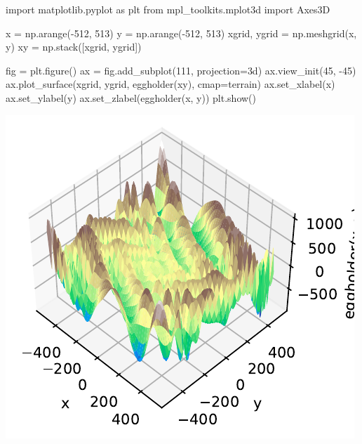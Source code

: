 \documentclass[
  letterpaper,
  DIV=11,
  numbers=noendperiod]{scrreprt}
\newenvironment{Shaded}{\begin{snugshade}}{\end{snugshade}}
\newcommand{\DecValTok}[1]{\textcolor[rgb]{0.68,0.00,0.00}{#1}}
\newcommand{\ImportTok}[1]{\textcolor[rgb]{0.00,0.46,0.62}{#1}}
\newcommand{\NormalTok}[1]{\textcolor[rgb]{0.00,0.23,0.31}{#1}}
\newcommand{\OperatorTok}[1]{\textcolor[rgb]{0.37,0.37,0.37}{#1}}
\newcommand{\StringTok}[1]{\textcolor[rgb]{0.13,0.47,0.30}{#1}}
\begin{document}
\begin{Shaded}
\begin{Highlighting}[]
\ImportTok{import}\NormalTok{ matplotlib.pyplot }\ImportTok{as}\NormalTok{ plt}
\ImportTok{from}\NormalTok{ mpl\_toolkits.mplot3d }\ImportTok{import}\NormalTok{ Axes3D}

\NormalTok{x }\OperatorTok{=}\NormalTok{ np.arange(}\OperatorTok{{-}}\DecValTok{512}\NormalTok{, }\DecValTok{513}\NormalTok{)}
\NormalTok{y }\OperatorTok{=}\NormalTok{ np.arange(}\OperatorTok{{-}}\DecValTok{512}\NormalTok{, }\DecValTok{513}\NormalTok{)}
\NormalTok{xgrid, ygrid }\OperatorTok{=}\NormalTok{ np.meshgrid(x, y)}
\NormalTok{xy }\OperatorTok{=}\NormalTok{ np.stack([xgrid, ygrid])}

\NormalTok{fig }\OperatorTok{=}\NormalTok{ plt.figure()}
\NormalTok{ax }\OperatorTok{=}\NormalTok{ fig.add\_subplot(}\DecValTok{111}\NormalTok{, projection}\OperatorTok{=}\StringTok{\textquotesingle{}3d\textquotesingle{}}\NormalTok{)}
\NormalTok{ax.view\_init(}\DecValTok{45}\NormalTok{, }\OperatorTok{{-}}\DecValTok{45}\NormalTok{)}
\NormalTok{ax.plot\_surface(xgrid, ygrid, eggholder(xy), cmap}\OperatorTok{=}\StringTok{\textquotesingle{}terrain\textquotesingle{}}\NormalTok{)}
\NormalTok{ax.set\_xlabel(}\StringTok{\textquotesingle{}x\textquotesingle{}}\NormalTok{)}
\NormalTok{ax.set\_ylabel(}\StringTok{\textquotesingle{}y\textquotesingle{}}\NormalTok{)}
\NormalTok{ax.set\_zlabel(}\StringTok{\textquotesingle{}eggholder(x, y)\textquotesingle{}}\NormalTok{)}
\NormalTok{plt.show()}
\end{Highlighting}
\end{Shaded}

\includegraphics{003_scipy_optimize_intro_files/figure-pdf/cell-12-output-1.pdf}
\end{document}
